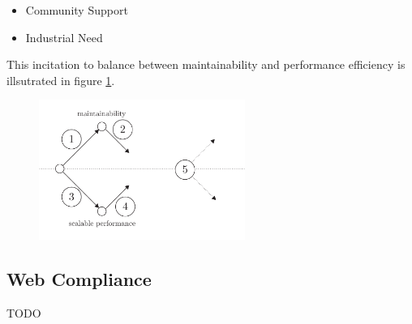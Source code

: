 \begin{itemize}
\item Community Support
\item Industrial Need
\end{itemize}

This incitation to balance between maintainability and performance efficiency is illsutrated in figure \ref{fig:state-of-the-art}.

\begin{figure}[h!] \label{fig:state-of-the-art}
\begin{center}
\includegraphics[width=0.6\textwidth]{../ressources/state-of-the-art.pdf}
\end{center}
\end{figure}

\subsection{Web Compliance}

TODO




